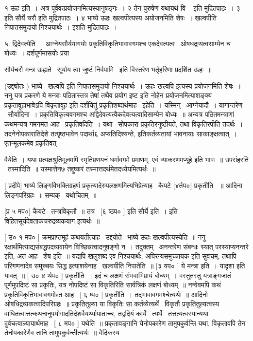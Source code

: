 \documentclass[11pt, openany]{book}
\begin{document}
१ ऊह इति~। अत्र पूर्ववत्प्रयोजनमित्यस्यानुषङ्गः~। २ {\qt तेन पुरुषेण यथायथं
वि \textendash\ } इति मुद्रितपाठः~। ३ {\qt इति सौर्ये चरौ} इति मुद्रितपाठः~। ४ {\qt भाष्ये}
ऊहः खल्वपीत्यस्य अयोजनमिति शेषः~। खल्वपीति निपातसमुदायो निश्चयार्थः~। 
इशति मुद्रितपाठः~। 

५. द्विदेवत्येति~। आग्नेयसौर्ययागयोः प्रकृतिविकृतिभावावगमश्च
एकदेवत्यत्व \textendash\ ओषधद्रव्यत्वसाम्येन च बोध्यः~। दर्शपूर्णमासयोः प्रया \textendash\ 





सौर्यचरौ मन्त्र ऊह्यते \textendash\ सूर्याय त्वा जुष्टं निर्वपामि \textendash\ इति विस्तरेण
भर्तृहरिणा प्रदर्शित ऊहः~॥

 (उद्द्योतः ) भाष्ये \textendash\ {\qt खल्वपि} इति निपातसमुदायो निश्चयार्थः~। {\qt ऊहः
खल्वपि} इत्यस्य प्रयोजनमिति शेषः~। ननु यत्र प्रकरणे ये मन्त्राः
पठितास्तत्र तेषां तथैव प्रयोग इष्ट इति नोहेन प्रयोजनमित्याशङ्क्य
प्रकृतावूहाभावेऽपि विकृतावूह इति दर्शयितुं प्रकृतिशब्दार्थमाह \textendash\ इहेति~। 
यस्मिन् \textendash\ आग्नेयादौ~। यागान्तरेण \textendash\ सौर्यादिना~। प्रकृतिविकृत्यवगमश्च
अद्विदेवत्यत्वैकदेवत्यत्वादिसाम्येन बोध्यः~॥ अन्यत्र पठितमन्त्राणां
कथमन्यत्र गमनमत आह \textendash\ प्रकृतिवदिति~। यथा \textendash\ सोपकारा प्रकृतिरनुष्ठीयते, तथा
विकृतिरपीति तदर्थः~। तदनेनोपकारातिदेशे तत्पृष्ठभावेन पदार्था६
अप्यतिदिश्यन्ते, इतिकर्तव्यतायां भावनायाः साकाङ्क्षत्वात्~। एतन्मूलकमेव
{\qt प्रकृतिवत्} 



वैयेति~। यथा प्रत्यक्षश्रुतिमूलमपि स्मृतिप्रणयनं धर्मावगमे प्रमाणम्,
एवं व्याकरणमप्यूहे इति भावः~॥ उपसंहरति \textendash\ तस्मादिति~॥ यस्मात्तेन७
तद्दुष्करं तस्मात्तदर्थमेतदध्येयमित्यर्थः~॥ 

 [ प्रदीपे] भाष्ये लिङ्गविभक्तिग्रहणं
प्रकृत्यादेरुपलक्षणमित्यभिप्रेत्याह \textendash\ कैयटे [४र्तप०] प्रकृतीति
~॥ आदिना लिङ्गपरिग्रहः~॥ सम्यक् \textendash\ यथोचितम्~॥ 

 [प्र ५ मप०] कैयटे \textendash\ तन्त्रविकृतौ~॥ तत्र \textendash\ [६ ष्ठप० ] इति सौर्ये
इति~। इति विहितसूर्यदेवताकचरुद्रव्यकयाग इत्यर्थः~॥ 

 [ उ० १ मप० ] क्रमप्राप्तमूहं कथयतीत्याह \textendash\ उद्दयोते \textendash\ भाष्ये ऊहः
खल्वपीत्यस्येति~॥ ननु रक्षार्थमित्याद्यसंबद्धपदव्यवायेन
विच्छिन्नत्वादनुषङ्गो न~। तदुक्तम् \textendash\ {\qt अनन्तरेण संबन्धः स्यात्
परस्याप्यनन्तरे} इति, अत आह \textendash\ शेष इति~॥ यद्यपि खलुशब्द एव निश्चयार्थः,
अपिरन्यसमुच्चायक इति सुवचम्, तथापि परिगणनादेव समुच्चयः सिद्ध
इत्याशयेनाह \textendash\ खल्वपीति निपातेति~॥ [३ यप० ] ये मन्त्रा इति~। 
यादृशा इति यावत्~॥ [ उ० ४ र्थप० ] प्रकृतीति~। इदं च लक्षणं
संभवाभिप्रायं बोध्यम्~। वस्तुतस्तु यत्राङ्गजातं पूर्णमुपदिष्टं सा
प्रकृतिः, यत्र नोपदिष्टं सा विकृतिरिति सार्वत्रिकं लक्षणं बोध्यम्~॥
नन्वेवमपि कथं प्रकृतिविकृतिभावावगमोsत आह \textendash\ [ ६ ष्प० ] प्रकृतीति~। 
तद्भावावगमश्चेत्यर्थः~॥ आदिनो ओषधिद्रव्यकत्वादिपरिग्रहः~॥
प्रकृतितुल्या या विकृतिः सा कर्तव्येत्यर्थे \textendash\ विकृतौ प्रकृतितुल्यत्वस्य
वाधितत्वात्तत्कथनानुपयोगादतिदेशवैयर्थ्यापाताच्च, तद्वदियं कार्ये \textendash\ 
त्यर्थे \textendash\ तत्तत्यत्वस्यान्यथा दुर्वचत्वान्न्यायार्थमाह \textendash\ [ ८ मप० ]
यथेति~॥ प्रकृतावङ्गानि येनोपकारेण तामुपकुर्वन्ति यथा, विकृतावपि तेन
तेनोपकारेणैव तानि तामुपकुर्वन्तीत्यर्थः~॥ वैदिकस्य 
\end{document}
